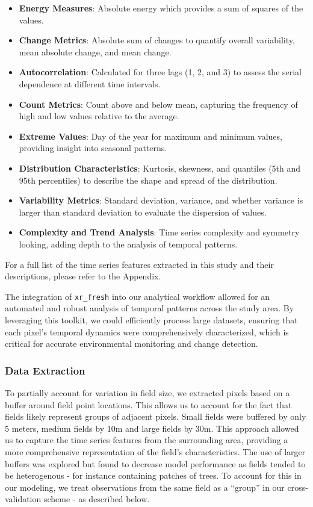 \documentclass[
  journal,
  twocolumn]{IEEEtran}
\providecommand{\tightlist}{%
  \setlength{\itemsep}{0pt}\setlength{\parskip}{0pt}}
\begin{document}
\begin{itemize}
\tightlist
\item
  \textbf{Energy Measures}: Absolute energy which provides a sum of
  squares of the values.
\item
  \textbf{Change Metrics}: Absolute sum of changes to quantify overall
  variability, mean absolute change, and mean change.
\item
  \textbf{Autocorrelation}: Calculated for three lags (1, 2, and 3) to
  assess the serial dependence at different time intervals.
\item
  \textbf{Count Metrics}: Count above and below mean, capturing the
  frequency of high and low values relative to the average.
\item
  \textbf{Extreme Values}: Day of the year for maximum and minimum
  values, providing insight into seasonal patterns.
\item
  \textbf{Distribution Characteristics}: Kurtosis, skewness, and
  quantiles (5th and 95th percentiles) to describe the shape and spread
  of the distribution.
\item
  \textbf{Variability Metrics}: Standard deviation, variance, and
  whether variance is larger than standard deviation to evaluate the
  dispersion of values.
\item
  \textbf{Complexity and Trend Analysis}: Time series complexity and
  symmetry looking, adding depth to the analysis of temporal patterns.
\end{itemize}

For a full list of the time series features extracted in this study and
their descriptions, please refer to the Appendix.

The integration of \texttt{xr\_fresh} into our analytical workflow
allowed for an automated and robust analysis of temporal patterns across
the study area. By leveraging this toolkit, we could efficiently process
large datasets, ensuring that each pixel's temporal dynamics were
comprehensively characterized, which is critical for accurate
environmental monitoring and change detection.

\hypertarget{data-extraction}{%
\subsubsection{Data Extraction}\label{data-extraction}}

To partially account for variation in field size, we extracted pixels
based on a buffer around field point locations. This allows us to
account for the fact that fields likely represent groups of adjacent
pixels. Small fields were buffered by only 5 meters, medium fields by
10m and large fields by 30m. This approach allowed us to capture the
time series features from the surrounding area, providing a more
comprehensive representation of the field's characteristics. The use of
larger buffers was explored but found to decrease model performance as
fields tended to be heterogenous - for instance containing patches of
trees. To account for this in our modeling, we treat observations from
the same field as a ``group'' in our cross-validation scheme - as
described below.
\end{document}
